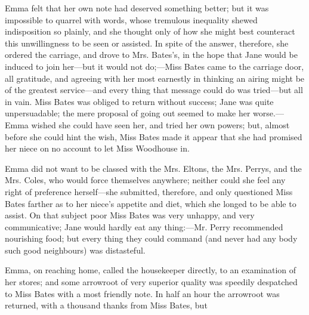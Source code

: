 
Emma felt that her own note had deserved something better; but it was impossible to quarrel with words, whose tremulous inequality shewed indisposition so plainly, and she thought only of how she might best counteract this unwillingness to be seen or assisted. In spite of the answer, therefore, she ordered the carriage, and drove to Mrs. Bates's, in the hope that Jane would be induced to join her---but it would not do;---Miss Bates came to the carriage door, all gratitude, and agreeing with her most earnestly in thinking an airing might be of the greatest service---and every thing that message could do was tried---but all in vain. Miss Bates was obliged to return without success; Jane was quite unpersuadable; the mere proposal of going out seemed to make her worse.---Emma wished she could have seen her, and tried her own powers; but, almost before she could hint the wish, Miss Bates made it appear that she had promised her niece on no account to let Miss Woodhouse in. 

Emma did not want to be classed with the Mrs. Eltons, the Mrs. Perrys, and the Mrs. Coles, who would force themselves anywhere; neither could she feel any right of preference herself---she submitted, therefore, and only questioned Miss Bates farther as to her niece's appetite and diet, which she longed to be able to assist. On that subject poor Miss Bates was very unhappy, and very communicative; Jane would hardly eat any thing:---Mr. Perry recommended nourishing food; but every thing they could command (and never had any body such good neighbours) was distasteful.

Emma, on reaching home, called the housekeeper directly, to an examination of her stores; and some arrowroot of very superior quality was speedily despatched to Miss Bates with a most friendly note. In half an hour the arrowroot was returned, with a thousand thanks from Miss Bates, but 

